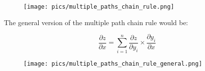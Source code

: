 \begin{figure}[htb]
	\centering
	 \texttt{[image: pics/multiple\_paths\_chain\_rule.png]}
\end{figure}



The general version of the multiple path chain rule would be:

\begin{displaymath}
 \frac{\partial z}{\partial x} = \sum_{i=1}^n \frac{\partial z}{\partial y_i} \times \frac{\partial y_i}{\partial x} 
\end{displaymath}


\begin{figure}[htb]
	\centering
	 \texttt{[image: pics/multiple\_paths\_chain\_rule\_general.png]}
\end{figure}




